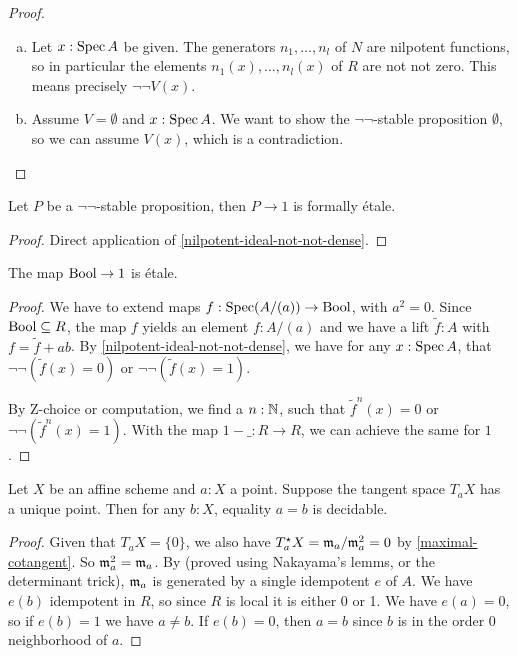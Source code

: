 \begin{proof}
  \begin{enumerate}[(a)]
  \item
    Let $x : \operatorname{Spec} A$ be given.
    The generators $n_1,\dots,n_l$ of $N$ are nilpotent functions,
    so in particular the elements $n_1(x), \dots, n_l(x)$ of $R$
    are not not zero.
    This means precisely $\neg\neg V(x)$.
  \item Assume $V=\emptyset$ and $x:\operatorname{Spec} A$.
        We want to show the $\neg\neg$-stable proposition $\emptyset$,
        so we can assume $V(x)$, which is a contradiction.
  \end{enumerate}
\end{proof}

\begin{proposition}%
  Let $P$ be a $\neg\neg$-stable proposition,
  then $P\to 1$ is formally étale.
\end{proposition}

\begin{proof}
  Direct application of \cref{nilpotent-ideal-not-not-dense}.
\end{proof}

\begin{proposition}%
  The map $\mathrm{Bool}\to 1$ is étale.
\end{proposition}

\begin{proof}
  We have to extend maps $f:\operatorname{Spec} (A/(a))\to \mathrm{Bool}$, with $a^2=0$.
  Since $\mathrm{Bool}\subseteq R$, the map $f$ yields an element $f:A/(a)$
  and we have a lift $\tilde{f}:A$ with $f=\tilde{f}+ab$.
  By \cref{nilpotent-ideal-not-not-dense},
  we have for any $x:\operatorname{Spec} A$, that $\neg\neg(\tilde{f}(x)=0)$ or $\neg\neg(\tilde{f}(x)=1)$.

  By Z-choice or computation, we find a $n:\mathbb{N}$,
  such that $\tilde{f}^n(x)=0$ or $\neg\neg(\tilde{f}^n(x)=1)$.
  With the map $1-\_:R\to R$, we can achieve the same for $1$.
\end{proof}

\begin{proposition}%
	\label{decidable-of-tangent}
	Let $X$ be an affine scheme and $a : X$ a point. Suppose the tangent space
	$T_a X$ has a unique point. Then for any $b : X$, equality $a = b$ is decidable.
\end{proposition}

\begin{proof}
	Given that $T_a X = \{0\}$, we also have $T^\star_a X = \mathfrak{m}_a / \mathfrak{m}_a^2 = 0$
	by \cref{maximal-cotangent}.
	So $\mathfrak{m}_a^2 = \mathfrak{m}_a$. By \cite[Lemma II.4.6]{lombardi-quitte}
	(proved using Nakayama's lemms, or the determinant trick), $\mathfrak{m}_a$ is generated
	by a single idempotent $e$ of $A$. We have $e(b)$ idempotent in $R$,
	so since $R$ is local it is either 0 or 1. We have $e(a) = 0$, so if $e(b) = 1$
	we have $a \ne b$. If $e(b) = 0$, then $a = b$ since $b$ is in the order 0
	neighborhood of $a$.
\end{proof}

